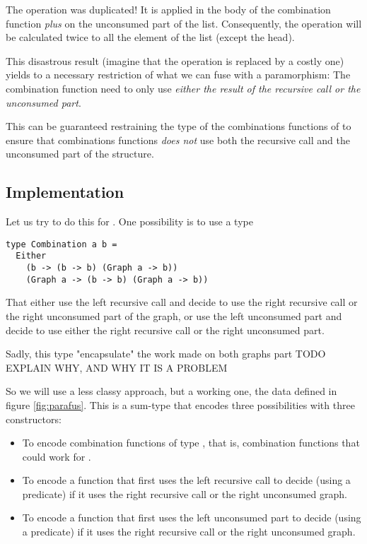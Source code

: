 The  operation was duplicated! It is applied in the body of the combination function \emph{plus} on the unconsumed part of the list. Consequently, the  operation will be calculated twice to all the element of the list (except the head).

This disastrous result (imagine that the  operation is replaced by a costly one) yields to a necessary restriction of what we can fuse with a paramorphism:
The combination function need to only use \emph{either the result of the recursive call or the unconsumed part}.

This can be guaranteed restraining the type of the combinations functions of  to ensure that combinations functions \emph{does not} use both the recursive call and the unconsumed part of the structure.

\subsection{Implementation}

Let us try to do this for .
One possibility is to use a type
\begin{verbatim}
type Combination a b =
  Either
    (b -> (b -> b) (Graph a -> b))
    (Graph a -> (b -> b) (Graph a -> b))
\end{verbatim}

That either use the left recursive call and decide to use the right recursive call or the right unconsumed part of the graph, or use the left unconsumed part and decide to use either the right recursive call or the right unconsumed part.

Sadly, this type "encapsulate" the work made on both graphs part TODO EXPLAIN WHY, AND WHY IT IS A PROBLEM

So we will use a less classy approach, but a working one, the  data defined in figure \ref{fig:parafus}. This is a sum-type that encodes three possibilities with three constructors:
\begin{itemize}
\item[\minline{B.}] To encode combination functions of type , that is, combination functions that could work for .
\item[\minline{L.}] To encode a function that first uses the left recursive call to decide (using a predicate) if it uses the right recursive call or the right unconsumed graph.
\item[\minline{R.}] To encode a function that first uses the left unconsumed part to decide (using a predicate) if it uses the right recursive call or the right unconsumed graph.
\end{itemize}

